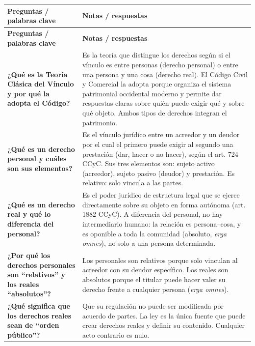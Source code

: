 \documentclass[12pt,oneside]{book}
\begin{document}
\begin{longtable}{
    >{\raggedright\arraybackslash}p{}
    >{\raggedright\arraybackslash}p{}
}
\toprule
\textbf{Preguntas / palabras clave} & \textbf{Notas / respuestas} \\
\midrule
\endfirsthead
\toprule
\textbf{Preguntas / palabras clave} & \textbf{Notas / respuestas} \\
\midrule
\endhead

\textbf{¿Qu\'e es la Teor\'ia Cl\'asica del V\'inculo y por qu\'e la adopta el C\'odigo?} &
Es la teor\'ia que distingue los derechos seg\'un si el v\'inculo es entre personas (derecho personal) o entre una persona y una cosa (derecho real). El C\'odigo Civil y Comercial la adopta porque organiza el sistema patrimonial occidental moderno y permite dar respuestas claras sobre qui\'en puede exigir qu\'e y sobre qu\'e objeto. Ambos tipos de derechos integran el patrimonio. \\[0.6em]

\textbf{¿Qu\'e es un derecho personal y cu\'ales son sus elementos?} &
Es el v\'inculo jur\'idico entre un acreedor y un deudor por el cual el primero puede exigir al segundo una prestaci\'on (dar, hacer o no hacer), seg\'un el art. 724 CCyC. Sus tres elementos son: sujeto activo (acreedor), sujeto pasivo (deudor) y prestaci\'on. Es relativo: solo vincula a las partes. \\[0.6em]

\textbf{¿Qu\'e es un derecho real y qu\'e lo diferencia del personal?} &
Es el poder jur\'idico de estructura legal que se ejerce directamente sobre su objeto en forma aut\'onoma (art. 1882 CCyC). A diferencia del personal, no hay intermediario humano: la relaci\'on es persona--cosa, y es oponible a toda la comunidad (absoluto, \textit{erga omnes}), no solo a una persona determinada. \\[0.6em]

\textbf{¿Por qu\'e los derechos personales son ``relativos'' y los reales ``absolutos''?} &
Los personales son relativos porque solo vinculan al acreedor con su deudor espec\'ifico. Los reales son absolutos porque el titular puede hacer valer su derecho frente a cualquier persona (\textit{erga omnes}). \\[0.6em]

\textbf{¿Qu\'e significa que los derechos reales sean de ``orden p\'ublico''?} &
Que su regulaci\'on no puede ser modificada por acuerdo de partes. La ley es la \'unica fuente que puede crear derechos reales y definir su contenido. Cualquier acto contrario es nulo. \\[0.6em]


\end{longtable}
\end{document}

